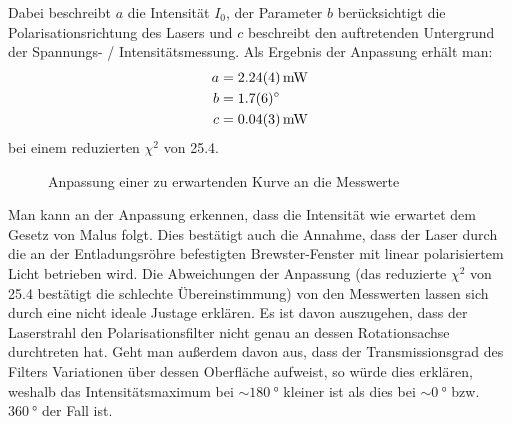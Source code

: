 \documentclass[11pt, a4paper]{article}
\numberwithin{equation}{section}
\begin{document}
Dabei beschreibt $a$ die Intensität $I_0$, der Parameter $b$ berücksichtigt die Polarisationsrichtung des Lasers und $c$ beschreibt den auftretenden Untergrund der Spannungs- / Intensitätsmessung.
Als Ergebnis der Anpassung erhält man:
\begin{align}
a&=\SI{2.24+-0.04}{\milli\watt}\\
b&=\SI{1.7+-0.6}{\degree}\\
c&=\SI{0.04+-0.03}{\milli\watt}
\end{align}
bei einem reduzierten $\chi^2$ von \num{25.4}.
\begin{figure}
	\centering
	
	\caption{Anpassung einer zu erwartenden Kurve an die Messwerte}
	\label{fig:malus}
\end{figure}
Man kann an der Anpassung erkennen, dass die Intensität wie erwartet dem Gesetz von Malus folgt.
Dies bestätigt auch die Annahme, dass der Laser durch die an der Entladungsröhre befestigten Brewster-Fenster mit linear polarisiertem Licht betrieben wird.
Die Abweichungen der Anpassung (das reduzierte $\chi^2$ von \num{25.4} bestätigt die schlechte Übereinstimmung) von den Messwerten lassen sich durch eine nicht ideale Justage erklären.
Es ist davon auszugehen, dass der Laserstrahl den Polarisationsfilter nicht genau an dessen Rotationsachse durchtreten hat.
Geht man außerdem davon aus, dass der Transmissionsgrad des Filters Variationen über dessen Oberfläche aufweist, so würde dies erklären, weshalb das Intensitätsmaximum bei $\sim \SI{180}{\degree}$ kleiner ist als dies bei $\sim \SI{0}{\degree}$ bzw. $\SI{360}{\degree}$ der Fall ist.
\end{document}
